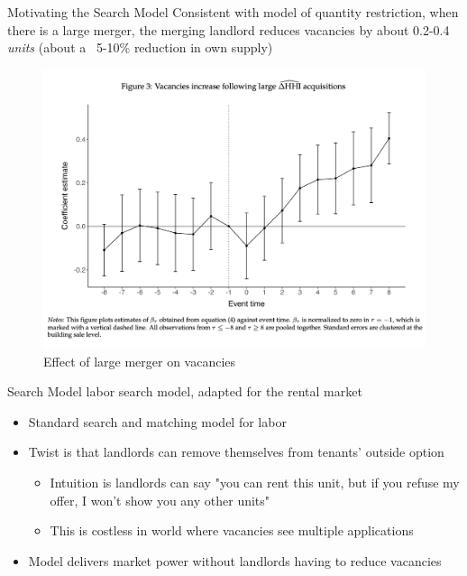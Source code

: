 \documentclass[10pt, xcolor=dvipsnames]{beamer}
\begin{document}
\begin{frame}{Motivating the Search Model}
Consistent with model of quantity restriction, when there is a large merger, the merging landlord reduces vacancies by about 0.2-0.4 \textit{units} (about a ~5-10\% reduction in own supply)
    \begin{figure}
        \centering
        \includegraphics[width=0.5\linewidth]{figs/fern-jmp-vacancy.png}
        \caption{Effect of large merger on vacancies}
        \label{fig:fern-vacancies}
    \end{figure}
\end{frame}


    

\begin{frame}{Search Model}
\cite{jarosh-search-2024} labor search model, adapted for the rental market 
    \begin{itemize}
        \item Standard search and matching model for labor
        \item Twist is that landlords can remove themselves from tenants' outside option
        \begin{itemize}
            \item Intuition is landlords can say "you can rent this unit, but if you refuse my offer, I won't show you any other units"
            \item This is costless in world where vacancies see multiple applications
        \end{itemize}
        \item Model delivers market power without landlords having to reduce vacancies
    \end{itemize}
\end{frame}
\end{document}
